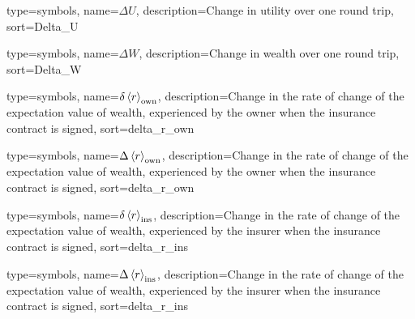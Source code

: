  

 
{}



{
 type={symbols}, 
 name={\ensuremath{\Delta U}},
 description={Change in utility over one round trip},
 sort=Delta_U
}

{
 type={symbols}, 
 name={\ensuremath{\Delta W}},
 description={Change in wealth over one round trip},
 sort=Delta_W
}

{
 type={symbols}, 
 name={\ensuremath{\delta \ave{r}_{\text{own}}}},
 description={Change in the rate of change of the expectation value of wealth, experienced by the owner when the insurance contract is signed},
 sort=delta_r_own
}

{
 type={symbols}, 
 name={\ensuremath{\Delta \ave{r}_{\text{own}}}},
 description={Change in the rate of change of the expectation value of wealth, experienced by the owner when the insurance contract is signed},
 sort=delta_r_own
}

{
 type={symbols}, 
 name={\ensuremath{\delta \ave{r}_{\text{ins}}}},
 description={Change in the rate of change of the expectation value of wealth, experienced by the insurer when the insurance contract is signed},
 sort=delta_r_ins
}

{
 type={symbols}, 
 name={\ensuremath{\Delta \ave{r}_{\text{ins}}}},
 description={Change in the rate of change of the expectation value of wealth, experienced by the insurer when the insurance contract is signed},
 sort=delta_r_ins
}

